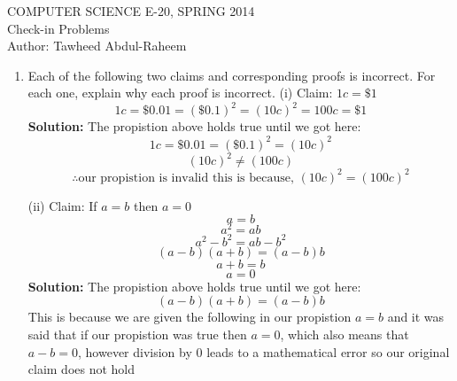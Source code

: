 \documentclass[12pt]{article}
\begin{document}
\begin{center}
    COMPUTER SCIENCE E-20, SPRING 2014 \\
    Check-in Problems \\
    Author: Tawheed Abdul-Raheem
\end{center}

\medskip


\begin{enumerate}
    \item Each of the following two claims and corresponding proofs is incorrect. For each one, explain why each proof is incorrect.
        \subitem (i) Claim: $1c = \$1$   \[ 1c = \$0.01= (\$ 0.1)^2 = (10c)^2 = 100c =\$1 \]
        \textbf{Solution: } 
        The propistion above holds true  until we got here:  
            \[ 1c = \$0.01= (\$ 0.1)^2 = (10c)^2 \] \[  (10c)^2 \neq (100c) \]
            \[  \therefore \text{our propistion is invalid this is because, } (10c)^2 = (100c)^2 \] 

        \subitem (ii) Claim: If $a=b$ then $a=0$\\ \[a=b\]\[a^2=ab\]\[a^2-b^2=ab-b^2\]\[(a-b)(a+b)=(a-b)b\]\[a+b=b\]\[a=0\]
        \textbf{Solution: } 
        The propistion above holds true  until we got here:  
            \[(a-b)(a+b)=(a-b)b\]
            This is because we are given the following in our propistion $a=b$ and it was said that if our propistion was true then $a = 0$, which also means that $a - b = 0$, however division by 0 leads to a mathematical error so our original claim does not hold

\end{enumerate}


\pagebreak
\end{document}
